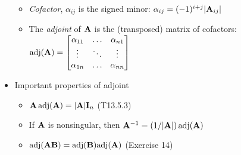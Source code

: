 \documentclass[a4paper, oneside]{book}
\begin{document}
\begin{itemize}
\begin{itemize}
	\item \textit{Cofactor}, $\alpha_{ij}$ is the signed minor: $\alpha_{ij}=(-1)^{i+j} |\mathbf{A}_{ij}|$	
	\item The \textit{adjoint} of $\mathbf{A}$ is the (transposed) matrix of cofactors: $\text{adj}(\mathbf{A})=\begin{bmatrix}
	\alpha_{11} & \hdots & \alpha_{n1} \\ \vdots & \ddots & \vdots \\ \alpha_{1n} & \hdots & \alpha_{nn} \end{bmatrix}$
	\end{itemize}
\item Important properties of adjoint
	\begin{itemize}
	\item $\mathbf{A} \,\text{adj}(\mathbf{A})=|\mathbf{A}|\mathbf{I}_n$ (T13.5.3)
	\item If $\mathbf{A}$ is nonsingular, then $\mathbf{A}^{-1}=(1/|\mathbf{A}|)\,\text{adj}(\mathbf{A})$
	\item $\text{adj}(\mathbf{AB})=\text{adj}(\mathbf{B})\text{adj}(\mathbf{A})$ (Exercise 14)
	\end{itemize}
\end{itemize}
\end{document}
